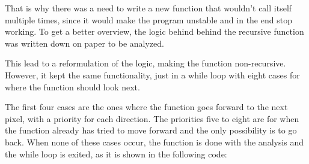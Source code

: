 That is why there was a need to write a new function that wouldn't call itself multiple times, since it would make the program unstable and in the end stop working. To get a better overview, the logic behind behind the recursive function was written down on paper to be analyzed.

This lead to a reformulation of the logic, making the function non-recursive. However, it kept the same functionality, just in a while loop with eight cases for where the function should look next.

The first four cases are the ones where the function goes forward to the next pixel, with a priority for each direction. The priorities five to eight are for when the function already has tried to move forward and the only possibility is to go back. When none of these cases occur, the function is done with the analysis and the while loop is exited, as it is shown in the following code:
